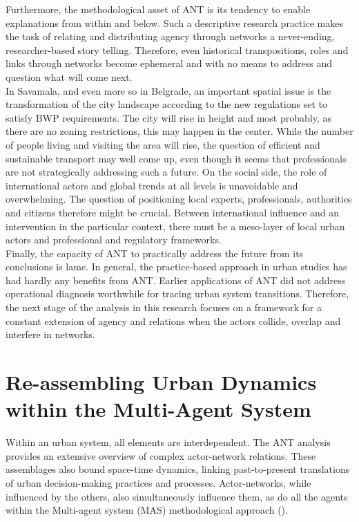 \documentclass[11pt]{report}
\begin{document}
{{{{Furthermore, the methodological asset of ANT is its tendency to enable explanations from within and below.
Such a descriptive research practice makes the task of relating and distributing agency through networks a never-ending, researcher-based story telling.
Therefore, even historical transpositions, roles and links through networks become ephemeral and with no means to address and question what will come next.
\\
 
In Savamala, and even more so in Belgrade, an important spatial issue is the transformation of the city landscape according to the new regulations set to satisfy BWP requirements. The city will rise in height and most probably, as there are no zoning restrictions, this may happen in the center. While the number of people living and visiting the area will rise, the question of efficient and sustainable transport may well come up, even though it seems that professionals are not strategically addressing such a future. On the social side, the role of international actors and global trends at all levels is unavoidable and overwhelming. The question of positioning local experts, professionals, authorities and citizens therefore might be crucial. Between international influence and an intervention in the particular context, there must be a meso-layer of local urban actors and professional and regulatory frameworks.
\\

Finally, the capacity of ANT to practically address the future from its conclusions is lame. In general, the practice-based approach in urban studies has had hardly any benefits from ANT. Earlier applications of ANT did not address operational diagnosis worthwhile for tracing urban system transitions. Therefore, the next stage of the analysis in this research focuses on a framework for a constant extension of agency and relations when the actors collide, overlap and interfere in networks. 

\chapter{Re-assembling Urban Dynamics within the Multi-Agent System}


Within an urban system, all elements are interdependent. The ANT analysis provides an extensive overview of complex actor-network relations. These assemblages also bound space-time dynamics, linking past-to-present translations of urban decision-making practices and processes. Actor-networks, while influenced by the others, also simultaneously influence them, as do all the agents within the Multi-agent system (MAS) methodological approach (\href{Bousquet}{\citealt{bousquet_multi-agent_2004}}).
\\

}}}}
\end{document}
